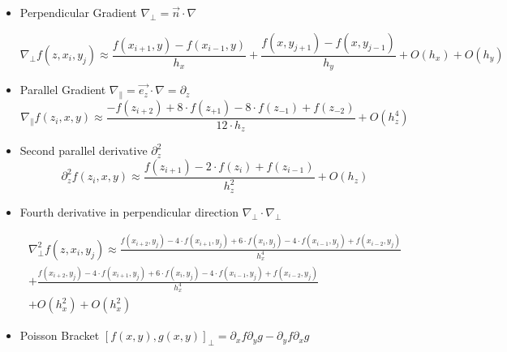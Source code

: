 \begin{itemize}
    \item Perpendicular Gradient $\nabla_{\perp} = \vec{n}\cdot\nabla$\\
     \begin{small}
        \begin{equation}
            \nabla_{\perp} f(z, x_i,y_j) \approx \frac{f(x_{i + 1}, y) - f(x_{i - 1}, y)}{h_x} + \frac{f(x, y_{j + 1}) - f(x, y_{j-1})}{h_y} + O(h_x) + O(h_y)
        \end{equation}
    \end{small}
    \item Parallel Gradient $\nabla_{\parallel} = \vec{e_z}\cdot\nabla = \partial_z$\\
    \begin{equation}
        \nabla_{\parallel} f(z_i,x,y) \approx \frac{-f(z_{i+2}) + 8 \cdot f(z_{+1}) - 8 \cdot f(z_{-1}) + f(z_{-2})}{12 \cdot h_z} + O(h_z^4)
    \end{equation}
    \item Second parallel derivative $\partial_z^2$\\
    \begin{equation}
           \partial_z^2f(z_i,x,y) \approx \frac{f(z_{i+1})-2\cdot f(z_i)+ f(z_{i-1})}{h_z^2} + O(h_z)
    \end{equation}
    \item Fourth derivative in perpendicular direction $\nabla_\perp \cdot \nabla_\perp$\\
    \begin{footnotesize}
    \begin{equation}
    \begin{split}
    \nabla_\perp^2f(z,x_i,y_j) \approx \frac{f(x_{i+2},y_j) - 4 \cdot f(x_{i+1},y_j) +6\cdot f(x_i,y_j) -4 \cdot f(x_{i-1},y_j) + f(x_{i-2}, y_j)}{h_x^4}  \\ + \frac{f(x_{i+2},y_j) - 4 \cdot f(x_{i+1},y_j) +6\cdot f(x_i,y_j) -4 \cdot f(x_{i-1},y_j) + f(x_{i-2}, y_j)}{h_x^4}  \\  + O(h_x^2) + O(h_x^2)
    \end{split}
    \end{equation}
    \end{footnotesize}
    \item Poisson Bracket $[f(x,y),g(x,y)]_\perp = \partial_x f \partial_y g - \partial_y f \partial_x g$
\end{itemize}

